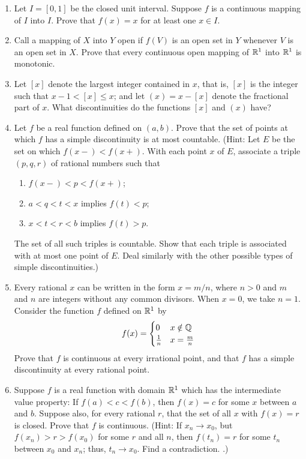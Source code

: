 \documentclass[../psets.tex]{subfiles}
\begin{document}
\begin{enumerate}[label={\textbf{\arabic*.}}]
    \item Let $I=[0,1]$ be the closed unit interval. Suppose $f$ is a continuous mapping of $I$ into $I$. Prove that $f(x)=x$ for at least one $x\in I$.
    \item Call a mapping of $X$ into $Y$ open if $f(V)$ is an open set in $Y$ whenever $V$ is an open set in $X$. Prove that every continuous open mapping of $\mathbb{R}^1$ into $\mathbb{R}^1$ is monotonic.
    \item Let $[x]$ denote the largest integer contained in $x$, that is, $[x]$ is the integer such that $x-1<[x]\leq x$; and let $(x)=x-[x]$ denote the fractional part of $x$. What discontinuities do the functions $[x]$ and $(x)$ have?
    \item Let $f$ be a real function defined on $(a,b)$. Prove that the set of points at which $f$ has a simple discontinuity is at most countable. (Hint: Let $E$ be the set on which $f(x-)<f(x+)$. With each point $x$ of $E$, associate a triple $(p,q,r)$ of rational numbers such that
    \begin{enumerate}
        \item $f(x-)<p<f(x+)$;
        \item $a<q<t<x$ implies $f(t)<p$;
        \item $x<t<r<b$ implies $f(t)>p$.
    \end{enumerate}
    The set of all such triples is countable. Show that each triple is associated with at most one point of $E$. Deal similarly with the other possible types of simple discontinuities.)
    \item Every rational $x$ can be written in the form $x=m/n$, where $n>0$ and $m$ and $n$ are integers without any common divisors. When $x=0$, we take $n=1$. Consider the function $f$ defined on $\mathbb{R}^1$ by
    \begin{equation*}
        f(x) =
        \begin{cases}
            0 & x\notin\mathbb{Q}\\
            \frac{1}{n} & x=\frac{m}{n}
        \end{cases}
    \end{equation*}
    Prove that $f$ is continuous at every irrational point, and that $f$ has a simple discontinuity at every rational point.
    \item Suppose $f$ is a real function with domain $\mathbb{R}^1$ which has the intermediate value property: If $f(a)<c<f(b)$, then $f(x)=c$ for some $x$ between $a$ and $b$. Suppose also, for every rational $r$, that the set of all $x$ with $f(x)=r$ is closed. Prove that $f$ is continuous. (Hint: If $x_n\to x_0$, but $f(x_n)>r>f(x_0)$ for some $r$ and all $n$, then $f(t_n)=r$ for some $t_n$ between $x_0$ and $x_n$; thus, $t_n\to x_0$. Find a contradiction. \parencite{bib:Fine}.)

\end{enumerate}
\end{document}
